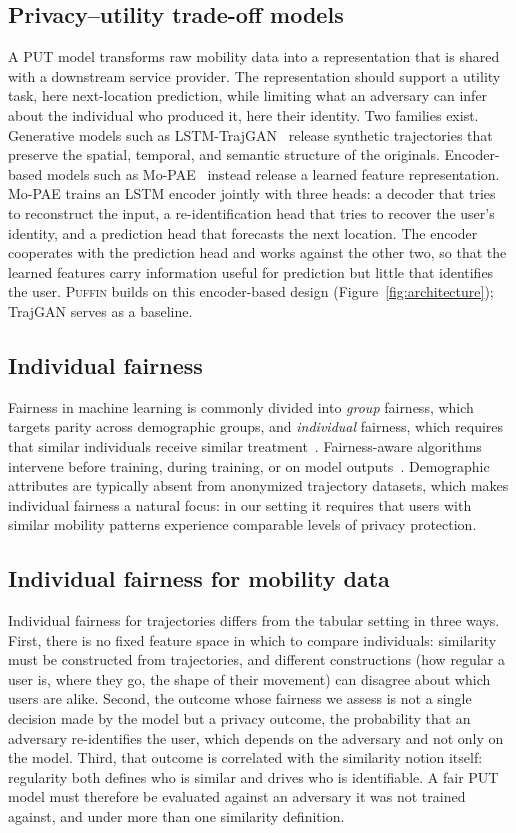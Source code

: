 \documentclass[sigconf,anonymous,review]{acmart}
\newcommand{\puffin}{\textsc{Puffin}}
\begin{document}
\subsection{Privacy--utility trade-off models}
A PUT model transforms raw mobility data into a representation that is shared with a downstream service provider. The representation should support a utility task, here next-location prediction, while limiting what an adversary can infer about the individual who produced it, here their identity. Two families exist. Generative models such as LSTM-TrajGAN~\cite{rao2020trajgan} release synthetic trajectories that preserve the spatial, temporal, and semantic structure of the originals. Encoder-based models such as Mo-PAE~\cite{zhan2023mopae} instead release a learned feature representation. Mo-PAE trains an LSTM encoder jointly with three heads: a decoder that tries to reconstruct the input, a re-identification head that tries to recover the user's identity, and a prediction head that forecasts the next location. The encoder cooperates with the prediction head and works against the other two, so that the learned features carry information useful for prediction but little that identifies the user. \puffin{} builds on this encoder-based design (Figure~\ref{fig:architecture}); TrajGAN serves as a baseline.

\subsection{Individual fairness}
Fairness in machine learning is commonly divided into \emph{group} fairness, which targets parity across demographic groups, and \emph{individual} fairness, which requires that similar individuals receive similar treatment~\cite{dwork2012fairness,verma2018definitions}. Fairness-aware algorithms intervene before training, during training, or on model outputs~\cite{hardt2016equality,mehrabi2021survey}. Demographic attributes are typically absent from anonymized trajectory datasets, which makes individual fairness a natural focus: in our setting it requires that users with similar mobility patterns experience comparable levels of privacy protection.

\subsection{Individual fairness for mobility data}
Individual fairness for trajectories differs from the tabular setting in three ways. First, there is no fixed feature space in which to compare individuals: similarity must be constructed from trajectories, and different constructions (how regular a user is, where they go, the shape of their movement) can disagree about which users are alike. Second, the outcome whose fairness we assess is not a single decision made by the model but a privacy outcome, the probability that an adversary re-identifies the user, which depends on the adversary and not only on the model. Third, that outcome is correlated with the similarity notion itself: regularity both defines who is similar and drives who is identifiable. A fair PUT model must therefore be evaluated against an adversary it was not trained against, and under more than one similarity definition.
\end{document}
